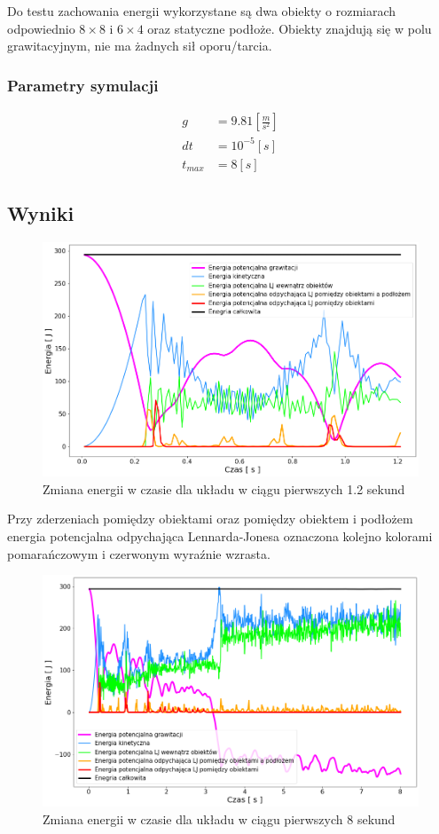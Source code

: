 \documentclass[12pt, letterpaper]{report}
\begin{document}
    Do testu zachowania energii wykorzystane są dwa obiekty o rozmiarach 
    odpowiednio $8 \times 8$ i $6 \times 4$ oraz statyczne podłoże. Obiekty
    znajdują się w polu grawitacyjnym, nie ma żadnych sił oporu/tarcia.

    \subsubsection{Parametry symulacji}
    \begin{align*}
        g &= 9.81 [\frac{m}{s^2}] \\
        dt &= 10^{-5} [s] \\
        t_{max} &= 8 [s]
    \end{align*}

    \subsection{Wyniki}
    \begin{figure}[H]
        \centering
        \includegraphics[width=14cm]{energy_test_0to2s}
        \caption{Zmiana energii w czasie dla układu w ciągu pierwszych 1.2 sekund}
    \end{figure}

    Przy zderzeniach pomiędzy obiektami oraz pomiędzy obiektem i podłożem energia potencjalna
    odpychająca Lennarda-Jonesa oznaczona kolejno kolorami pomarańczowym i czerwonym
    wyraźnie wzrasta.
    \begin{figure}[H]
        \centering
        \includegraphics[width=14.6cm]{energy_test_0to8s}
        \caption{Zmiana energii w czasie dla układu w ciągu pierwszych 8 sekund}
    \end{figure}
    
\end{document}
